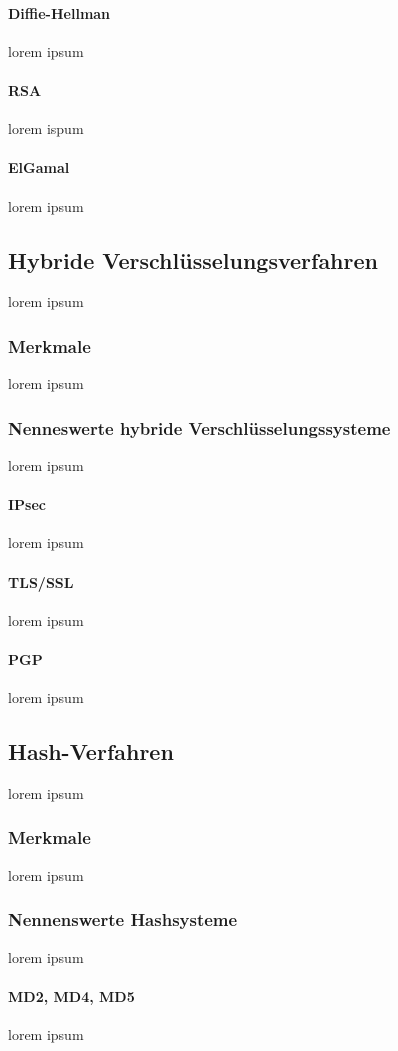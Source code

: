 \documentclass[12pt,a4paper]{report}
\begin{document}
\paragraph{Diffie-Hellman}
lorem ipsum
\paragraph{RSA}
lorem ispum
\paragraph{ElGamal}
lorem ipsum
\subsection{Hybride Verschlüsselungsverfahren}
lorem ipsum
\subsubsection{Merkmale}
lorem ipsum
\subsubsection{Nenneswerte hybride Verschlüsselungssysteme}
lorem ipsum
\paragraph{IPsec}
lorem ipsum
\paragraph{TLS/SSL}
lorem ipsum
\paragraph{PGP}
lorem ipsum
\subsection{Hash-Verfahren}
lorem ipsum
\subsubsection{Merkmale}
lorem ipsum
\subsubsection{Nennenswerte Hashsysteme}
lorem ipsum
\paragraph{MD2, MD4, MD5}
lorem ipsum
\end{document}
